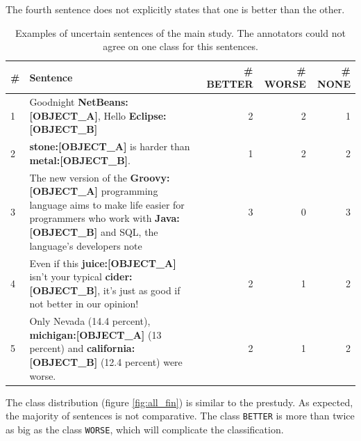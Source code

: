 The fourth sentence does not explicitly states that one is better than the other.
\begin{table}[htbp]
\centering
\caption{Examples of uncertain sentences of the main study. The annotators could not agree on one class for this sentences.}
\label{tbl:all_res}
\begin{tabularx}{\textwidth}{lXrrr}
\toprule
\# & Sentence        & \# BETTER  & \# WORSE & \# NONE            \\ \midrule
1 & Goodnight \textbf{{\color[HTML]{9A14B2}NetBeans:{[}OBJECT\_A{]}}}, Hello \textbf{{\color[HTML]{6CB219}Eclipse:{[}OBJECT\_B{]}}} & 2&2&1\\

2 & \textbf{{\color[HTML]{9A14B2}stone:{[}OBJECT\_A{]}}} is harder than \textbf{{\color[HTML]{6CB219}metal:{[}OBJECT\_B{]}}}. & 1 & 2 & 2 \\

3 & The new version of the \textbf{{\color[HTML]{9A14B2}Groovy:{[}OBJECT\_A{]}}} programming language aims to make life easier for programmers who work with \textbf{{\color[HTML]{6CB219}Java:{[}OBJECT\_B{]}}} and SQL, the language's developers note & 3 & 0 & 3 \\

4 & Even if this \textbf{{\color[HTML]{9A14B2}juice:{[}OBJECT\_A{]}}} isn't your typical \textbf{{\color[HTML]{6CB219}cider:{[}OBJECT\_B{]}}}, it's just as good if not better in our opinion! & 2 & 1 & 2 \\

5 & Only Nevada (14.4 percent), \textbf{{\color[HTML]{9A14B2}michigan:{[}OBJECT\_A{]}}}  (13 percent) and  \textbf{{\color[HTML]{6CB219}california:{[}OBJECT\_B{]}}} (12.4 percent) were worse. & 2 & 1 & 2\\
\bottomrule                              
\end{tabularx}
\end{table}


The class distribution (figure \ref{fig:all_fin}) is similar to the prestudy. As expected, the majority of sentences is not comparative. 
The class \texttt{BETTER} is more than twice as big as the class \texttt{WORSE}, which will complicate the classification.


